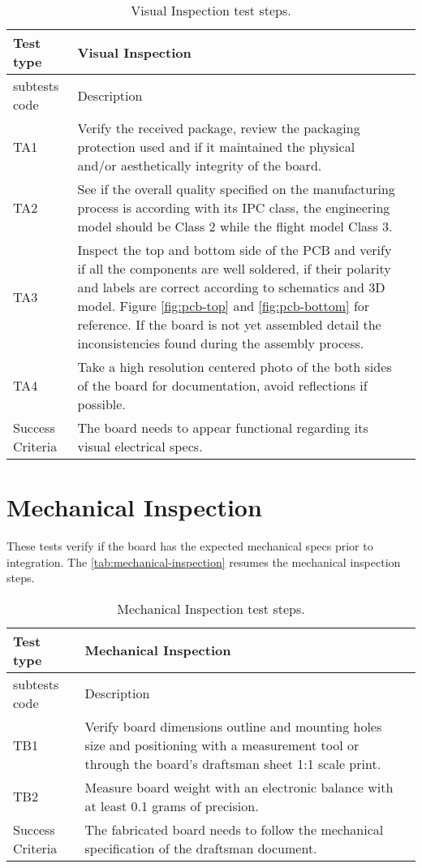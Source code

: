 \begin{table}[!htb]
\centering
\caption{Visual Inspection test steps.}
\label{tab:visual-inspection}
\begin{tabular}{m{3cm} m{12cm} m{3cm}}
\toprule
Test type & Visual Inspection \\
\midrule
\midrule
subtests code & Description \\ 
\midrule
TA1 & Verify the received package, review the packaging protection used and if it maintained the physical and/or aesthetically integrity of the board. \\
\midrule
TA2 & See if the overall quality specified on the manufacturing process is according with its IPC class, the engineering model should be Class 2 while the flight model Class 3. \\
\midrule
TA3 & Inspect the top and bottom side of the PCB and verify if all the components are well soldered, if their polarity and labels are correct according to schematics and 3D model. Figure \ref{fig:pcb-top} and \ref{fig:pcb-bottom} for reference. If the board is not yet assembled detail the inconsistencies found during the assembly process. \\
\midrule
TA4 & Take a high resolution centered photo of the both sides of the board for documentation, avoid reflections if possible. \\
\midrule
\midrule
Success Criteria & The board needs to appear functional regarding its visual electrical specs. \\
\bottomrule
\end{tabular}
\end{table}

\section {Mechanical Inspection}

These tests verify if the board has the expected mechanical specs prior to integration. The \autoref{tab:mechanical-inspection} resumes the mechanical inspection steps. 

\begin{table}[!htb]
\centering
\caption{Mechanical Inspection test steps.}
\label{tab:mechanical-inspection}
\begin{tabular}{m{3cm} m{12cm} m{3cm}}
\toprule
Test type & Mechanical Inspection \\
\midrule
\midrule
subtests code & Description \\ 
\midrule
TB1 & Verify board dimensions outline and mounting holes size and positioning with a measurement tool or through the board's draftsman sheet 1:1 scale print. \\
\midrule
TB2 & Measure board weight with an electronic balance with at least 0.1 grams of precision. \\
\midrule
\midrule
Success Criteria & The fabricated board needs to follow the mechanical specification of the draftsman document. \\
\bottomrule
\end{tabular}
\end{table}

